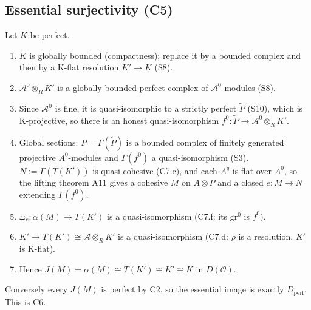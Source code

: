 \documentclass[11pt,a4paper]{article}
\newcommand{\cA}{\mathcal{A}}
\newcommand{\Ocal}{\mathcal{O}}
\newcommand{\Dperf}{D_{\mathrm{perf}}}
\begin{document}
\subsection{Essential surjectivity (C5)}
Let $K$ be perfect.
\begin{enumerate}
\item $K$ is globally bounded (compactness); replace it by a bounded complex and then by a K-flat
resolution $K'\to K$ (S8).
\item $\cA^0\otimes_RK'$ is a globally bounded perfect complex of $\cA^0$-modules (S8).
\item Since $\cA^0$ is fine, it is quasi-isomorphic to a strictly perfect $\tilde P$ (S10), which is
K-projective, so there is an honest quasi-isomorphism $f^0\colon\tilde P\to\cA^0\otimes_RK'$.
\item Global sections: $P=\Gamma(\tilde P)$ is a bounded complex of finitely generated projective
$A^0$-modules and $\Gamma(f^0)$ a quasi-isomorphism (S3). $N:=\Gamma(T(K'))$ is quasi-cohesive (C7.c), and
each $A^q$ is flat over $A^0$, so the lifting theorem A11 gives a cohesive $M$ on $A\otimes P$ and
a closed $e\colon M\to N$ extending $\Gamma(f^0)$.
\item $\Xi_e\colon\alpha(M)\to T(K')$ is a quasi-isomorphism (C7.f: its $\mathrm{gr}^0$ is $f^0$).
\item $K'\to T(K')\cong\cA\otimes_RK'$ is a quasi-isomorphism (C7.d: $\rho$ is a resolution, $K'$ is K-flat).
\item Hence $J(M)=\alpha(M)\cong T(K')\cong K'\cong K$ in $D(\Ocal)$.
\end{enumerate}
Conversely every $J(M)$ is perfect by C2, so the essential image is exactly $\Dperf$. This is C6.
\end{document}
